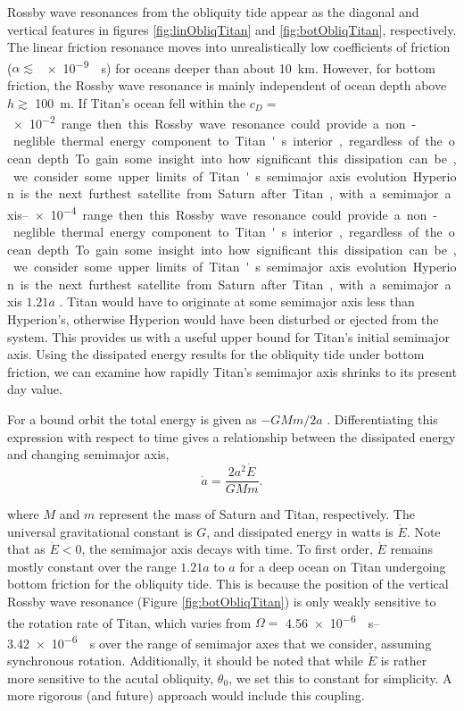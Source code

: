 Rossby wave resonances from the obliquity tide appear as the diagonal and vertical features in figures \ref{fig:linObliqTitan} and \ref{fig:botObliqTitan}, respectively. The linear friction resonance moves into unrealistically low coefficients of friction ($\alpha \lesssim$ \SI{e-9}{\per\second}) for oceans deeper than about \SI{10}{\kilo\metre}. However, for bottom friction, the Rossby wave resonance is mainly independent of ocean depth above $h \gtrsim$ \SI{100}{\metre}. If Titan's ocean fell within the $c_D =$ \SIrange{e-2}{e-4} range then this Rossby wave resonance could provide a non-neglible thermal energy component to Titan's interior, regardless of the ocean depth. To gain some insight into how significant this dissipation can be, we consider some upper limits of Titan's semimajor axis evolution.

Hyperion is the next furthest satellite from Saturn after Titan, with a semimajor axis  $1.21 a$ \citep{sears1995tidal}. Titan would have to originate at some semimajor axis less than Hyperion's, otherwise Hyperion would have been disturbed or ejected from the system. This provides us with a useful upper bound for Titan's  initial semimajor axis. Using the dissipated energy results for the obliquity tide under bottom friction, we can examine how rapidly Titan's semimajor axis shrinks to its present day value.

For a bound orbit the total energy is given as $-GMm/2a$ \citep{goldreich1966q}. Differentiating this expression with respect to time gives a relationship between the dissipated energy and changing semimajor axis,
\begin{equation}
\dot{a} = \dfrac{2a^2 \dot{E}}{GM m}.
\label{eq:adot}
\end{equation}

where $M$ and $m$ represent the mass of Saturn and Titan, respectively. The universal gravitational constant is $G$, and dissipated energy in watts is $\dot{E}$. Note that as $\dot{E} < 0$, the semimajor axis decays with time. To first order, $\dot{E}$ remains mostly constant over the range $1.21 a$ to $a$ for a deep ocean on Titan undergoing bottom friction for the obliquity tide. This is because the position of the vertical Rossby wave resonance (Figure \ref{fig:botObliqTitan}) is only weakly sensitive to the rotation rate of Titan, which varies from $\Omega =$ \SIrange{4.56e-6}{3.42e-6}{\per\second} over the range of semimajor axes that we consider, assuming synchronous rotation. Additionally, it should be noted that while $\dot{E}$ is rather more sensitive to the acutal obliquity, $\theta_0$, we set this to constant for simplicity. A more rigorous (and future) approach would include this coupling.

